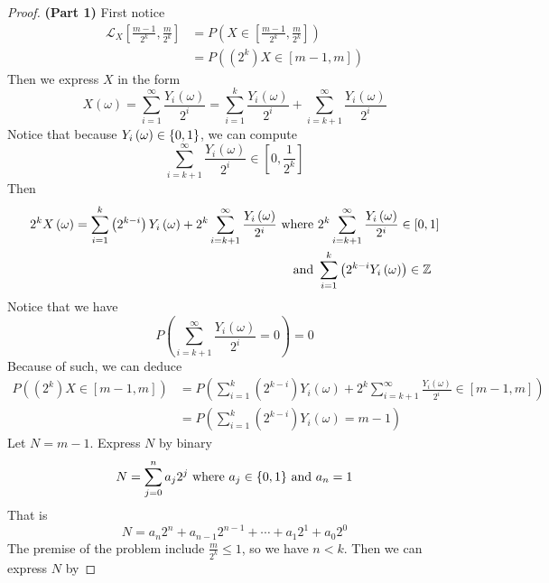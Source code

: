 \documentclass{report}
\begin{document}
\begin{proof}
\textbf{(Part 1)}
First notice
\begin{align*}
\mathcal{L}_X\left[\frac{m-1}{2^k},\frac{m}{2^k} \right]&=P\left(X\in \left[\frac{m-1}{2^k},\frac{m}{2^k} \right] \right)\\
&=P\left(\left(2^k \right) X \in \left[m-1,m \right] \right)
\end{align*}
Then we express $X$ in the form
 \begin{equation*}
X\left(\omega \right)=\sum_{i=1}^\infty \frac{Y_i\left(\omega \right)}{2^i}=\sum_{i=1}^k \frac{Y_i\left(\omega \right)}{2^i}+\sum_{i=k+1}^\infty \frac{Y_i\left(\omega \right)}{2^i}
\end{equation*}
Notice that because $Y_i\left(\omega \right)\in \{ 0,1 \}$, we can compute 
\begin{equation*}
\sum_{i=k+1}^\infty \frac{Y_i\left(\omega \right)}{2^i}\in \left[0,\frac{1}{2^k} \right]
\end{equation*}
Then 
\begin{align*}
  2^k X\left(\omega \right)=\sum_{i=1}^k \left(2^{k-i} \right)Y_i\left(\omega \right)+ 2^k\sum_{i=k+1}^\infty \frac{Y_i\left(\omega \right)}{2^i}\text{ where }&2^k\sum_{i=k+1}^\infty \frac{Y_i\left(\omega \right)}{2^i}\in \left[0,1 \right]\\
  \text{ and }&\sum_{i=1}^k \left(2^{k-i}Y_i\left(\omega \right) \right)\in\mathbb{Z}
\end{align*}
Notice that we have 
\begin{equation*}
P\left( \sum_{i=k+1}^{\infty} \frac{Y_i\left(\omega \right)}{2^i}=0 \right)=0
\end{equation*}
Because of such, we can deduce
\begin{align*}
P\left(\left(2^k \right)X\in \left[m-1,m \right] \right)&=P\left( \sum_{i=1}^k \left(2^{k-i} \right)Y_i\left(\omega \right)+ 2^k\sum_{i=k+1}^\infty \frac{Y_i\left(\omega \right)}{2^i} \in \left[m-1,m \right]\right)\\
&=P\left( \sum_{i=1}^k \left(2^{k-i} \right)Y_i\left(\omega \right) =m-1\right)
\end{align*}
Let $N=m-1$. Express $N$ by binary
 \begin{equation*}
N=\sum_{j=0}^n a_j 2^j\text{ where $a_j\in \{ 0,1 \}$ and $a_n=1$}
\end{equation*}
That is 
\begin{equation*}
N=a_n2^n+a_{n-1}2^{n-1}+\cdots +a_{1}2^1+a_{0}2^0
\end{equation*}
The premise of the problem include $\frac{m}{2^k}\leq 1$, so we have $n<k$. Then we can express  $N$ by

\end{proof}
\end{document}
